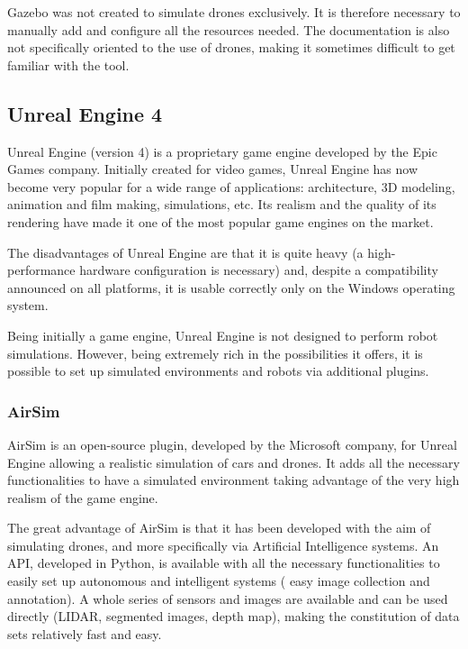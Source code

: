 Gazebo was not created to simulate drones exclusively. It is therefore necessary to manually add and configure all the resources needed. The documentation is also not specifically oriented to the use of drones, making it sometimes difficult to get familiar with the tool.

\subsection{Unreal Engine 4}

Unreal Engine \cite{unrealengine2021website} (version 4) is a proprietary game engine developed by the Epic Games \cite{epicgames2021website} company. Initially created for video games, Unreal Engine has now become very popular for a wide range of applications: architecture, 3D modeling, animation and film making, simulations, etc. Its realism and the quality of its rendering have made it one of the most popular game engines on the market.

The disadvantages of Unreal Engine are that it is quite heavy (a high-performance hardware configuration is necessary) and, despite a compatibility announced on all platforms, it is usable correctly only on the Windows operating system.

Being initially a game engine, Unreal Engine is not designed to perform robot simulations. However, being extremely rich in the possibilities it offers, it is possible to set up simulated environments and robots via additional plugins.

\subsubsection{AirSim}

AirSim \cite{shah2018airsim} is an open-source plugin, developed by the Microsoft company, for Unreal Engine allowing a realistic simulation of cars and drones. It adds all the necessary functionalities to have a simulated environment taking advantage of the very high realism of the game engine.

The great advantage of AirSim is that it has been developed with the aim of simulating drones, and more specifically via Artificial Intelligence systems. An API, developed in Python, is available with all the necessary functionalities to easily set up autonomous and intelligent systems (\eg{} easy image collection and annotation). A whole series of sensors and images are available and can be used directly (LIDAR, segmented images, depth map), making the constitution of data sets relatively fast and easy.

